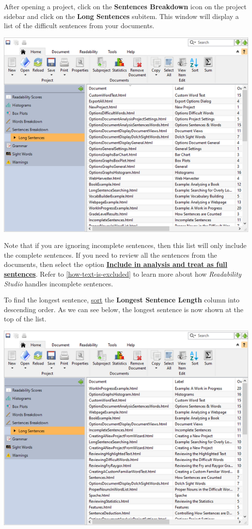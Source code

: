 \documentclass[
]{book}
\theoremstyle{definition}
\theoremstyle{definition}
\theoremstyle{definition}
\theoremstyle{definition}
\theoremstyle{remark}
\begin{document}
After opening a project, click on the \textbf{Sentences Breakdown} icon on the project sidebar and click on the \textbf{Long Sentences} subitem. This window will display a list of the difficult sentences from your documents.

\includegraphics{Images/batchlongsentences.png}

Note that if you are ignoring incomplete sentences, then this list will only include the complete sentences. If you need to review all the sentences from the documents, then select the option \protect\hyperlink{document-analysis}{\textbf{Include in analysis and treat as full sentences}}. Refer to \ref{how-text-is-excluded} to learn more about how \emph{Readability Studio} handles incomplete sentences.

To find the longest sentence, \protect\hyperlink{column-sorting}{sort} the \textbf{Longest Sentence Length} column into descending order. As we can see below, the longest sentence is now shown at the top of the list.

\includegraphics{Images/batchlongestsentence.png}
\end{document}
